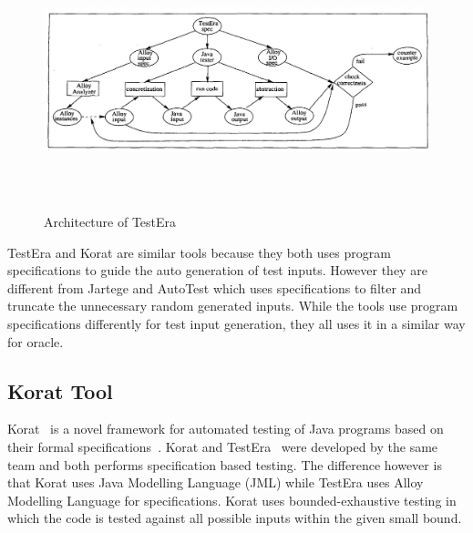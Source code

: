 \begin{figure}[h]
	\centering
	\includegraphics[width=13cm, height=7.5cm]{chapter3/testera.png}
	\caption{Architecture of TestEra}
	\label{fig:testera}
\end{figure}


TestEra and Korat are similar tools because they both uses program specifications to guide the auto generation of test inputs. However they are different from Jartege and AutoTest which uses specifications to filter and truncate the unnecessary random generated inputs. While the tools use program specifications differently for test input generation, they all uses it in a similar way for oracle. 



\subsection{Korat Tool} %
Korat~\cite{Boyapati2002} is a novel framework for automated testing of Java programs based on their formal specifications~\cite{chang1999structural}. Korat and TestEra~\cite{Khurshid2004} were developed by the same team and both performs specification based testing. The difference however is that Korat uses Java Modelling Language (JML) while TestEra uses Alloy Modelling Language for specifications. Korat uses bounded-exhaustive testing \cite{khurshid2001checking} in which the code is tested against all possible inputs within the given small bound.

